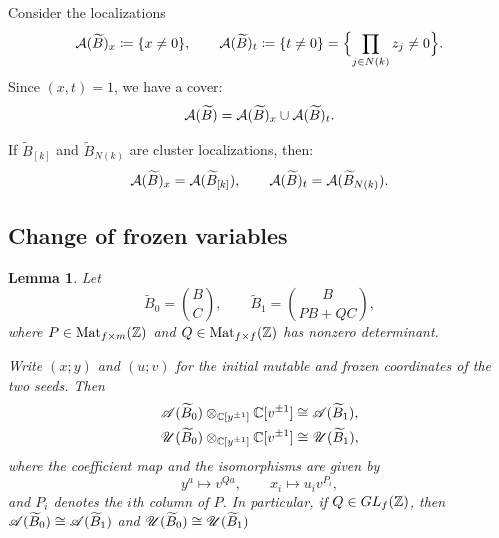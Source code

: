 \documentclass[12pt, letter]{amsart}
\newtheorem{lemma}[dummy]{Lemma}
\theoremstyle{definition}
\begin{document}
Consider the localizations
\[
 \mathcal{A}(\widetilde B)_x\coloneqq\{x\ne0\},\qquad
 \mathcal{A}(\widetilde B)_t\coloneqq\{t\ne0\}=\Bigl\{\prod_{j\in N(k)}z_j\ne0\Bigr\}.
\]
Since $(x,t) = 1$, we have a cover: 
\begin{equation}
\label{eq:sink_cover}
 \mathcal{A}(\widetilde B)=\mathcal{A}(\widetilde B)_x\cup \mathcal{A}(\widetilde B)_t.
\end{equation}

If  $\widetilde B_{[k]}$ and $\widetilde B_{N(k)}$ are cluster localizations, then: 
\[
 \mathcal{A}(\widetilde B)_x=\mathcal{A}(\widetilde B_{[k]}),\qquad
 \mathcal{A}(\widetilde B)_t=\mathcal{A}(\widetilde B_{N(k)}).
\]



\subsection{Change of frozen variables}


\begin{lemma}
\label{lem:coefficient-change}
Let
\[
    \widetilde B_0=\binom BC,\qquad
    \widetilde B_1=\binom B{PB+QC},
\]
where
$P\in\operatorname{Mat}_{f\times m}(\mathbb{Z})$ and
$Q\in\operatorname{Mat}_{f\times f}(\mathbb{Z})$ has nonzero determinant.

Write $(x;y)$ and $(u;v)$ for the initial mutable and frozen
coordinates of the two seeds. Then
\[
\begin{aligned}
    \mathscr{A}(\widetilde B_0)\otimes_{\mathbb{C}[y^{\pm1}]}\mathbb{C}[v^{\pm1}]
    &\cong \mathscr{A}(\widetilde B_1),\\
    \mathscr{U}(\widetilde B_0)\otimes_{\mathbb{C}[y^{\pm1}]}\mathbb{C}[v^{\pm1}]
    &\cong \mathscr{U}(\widetilde B_1),
\end{aligned}
\]
where the coefficient map and the isomorphisms are given by
\[
    y^a\longmapsto v^{Qa},
    \qquad
    x_i\longmapsto u_i v^{P_i},
\]
and $P_i$ denotes the $i$th column of $P$.
In particular, if $Q\in GL_f(\mathbb{Z})$, then
$\mathscr{A}(\widetilde B_0)\cong \mathscr{A}(\widetilde B_1)$ and \( \mathscr{U}(\widetilde B_0) \cong \mathscr{U}(\widetilde B_1)\)
\end{lemma}
\end{document}

